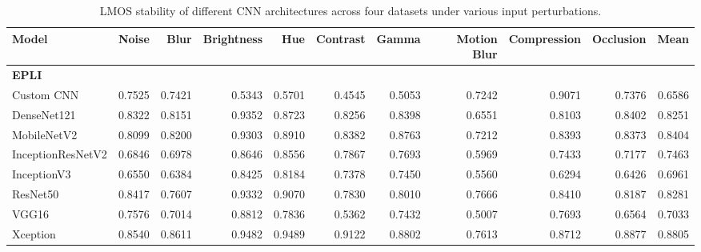 \documentclass[a4paper,fleqn]{cas-dc}
\begin{document}
\begin{table}[t]
    \centering
    \caption{LMOS stability of different CNN architectures across four datasets under various input perturbations.}
    \label{tab:lmos_stability_all}

    \scriptsize
    \setlength{\tabcolsep}{3pt}
    \renewcommand{\arraystretch}{1.1}

    \begin{tabular}{l *{10}{r}}
        \toprule
        \textbf{Model} &
        \textbf{Noise} & \textbf{Blur} & \textbf{Brightness} &
        \textbf{Hue} & \textbf{Contrast} & \textbf{Gamma} &
        \textbf{Motion Blur} & \textbf{Compression} &
        \textbf{Occlusion} & \textbf{Mean} \\
        \midrule

        \multicolumn{11}{l}{\textbf{EPLI}} \\
        \midrule
        Custom CNN        & 0.7525 & 0.7421 & 0.5343 & 0.5701 & 0.4545 & 0.5053 & 0.7242 & 0.9071 & 0.7376 & 0.6586 \\
        DenseNet121       & 0.8322 & 0.8151 & 0.9352 & 0.8723 & 0.8256 & 0.8398 & 0.6551 & 0.8103 & 0.8402 & 0.8251 \\
        MobileNetV2       & 0.8099 & 0.8200 & 0.9303 & 0.8910 & 0.8382 & 0.8763 & 0.7212 & 0.8393 & 0.8373 & 0.8404 \\
        InceptionResNetV2 & 0.6846 & 0.6978 & 0.8646 & 0.8556 & 0.7867 & 0.7693 & 0.5969 & 0.7433 & 0.7177 & 0.7463 \\
        InceptionV3       & 0.6550 & 0.6384 & 0.8425 & 0.8184 & 0.7378 & 0.7450 & 0.5560 & 0.6294 & 0.6426 & 0.6961 \\
        ResNet50          & 0.8417 & 0.7607 & 0.9332 & 0.9070 & 0.7830 & 0.8010 & 0.7666 & 0.8410 & 0.8187 & 0.8281 \\
        VGG16             & 0.7576 & 0.7014 & 0.8812 & 0.7836 & 0.5362 & 0.7432 & 0.5007 & 0.7693 & 0.6564 & 0.7033 \\
        Xception          & 0.8540 & 0.8611 & 0.9482 & 0.9489 & 0.9122 & 0.8802 & 0.7613 & 0.8712 & 0.8877 & 0.8805 \\


\end{tabular}
\end{table}
\end{document}
